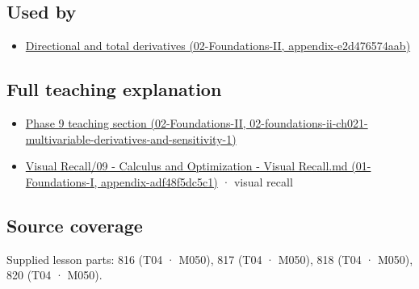 \subsection{Used by}\label{appendix-677b59746ae0-used-by}

\begin{itemize}
\tightlist
\item
  \href{../02-Foundations-II/main.pdf\#nameddest=appendix-e2d476574aab}{Directional and total derivatives (02-Foundations-II, appendix-e2d476574aab)}
\end{itemize}

\subsection{Full teaching explanation}\label{appendix-677b59746ae0-full-teaching-explanation}

\begin{itemize}
\tightlist
\item
  \href{../02-Foundations-II/main.pdf\#nameddest=02-foundations-ii-ch021-multivariable-derivatives-and-sensitivity-1}{Phase 9 teaching section (02-Foundations-II, 02-foundations-ii-ch021-multivariable-derivatives-and-sensitivity-1)}
\item
  \href{../01-Foundations-I/main.pdf\#nameddest=appendix-adf48f5dc5c1}{Visual Recall/09 - Calculus and Optimization - Visual Recall.md (01-Foundations-I, appendix-adf48f5dc5c1)} · visual recall
\end{itemize}

\subsection{Source coverage}\label{appendix-677b59746ae0-source-coverage}

Supplied lesson parts: 816 (T04 · M050), 817 (T04 · M050), 818 (T04 · M050), 820 (T04 · M050).
